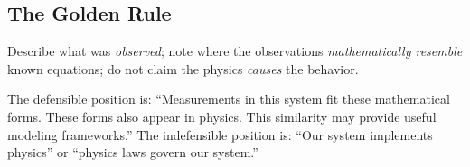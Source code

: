 \subsection{The Golden Rule}

Describe what was \emph{observed}; note where the observations
\emph{mathematically resemble} known equations; do not claim the physics
\emph{causes} the behavior.

The defensible position is: ``Measurements in this system fit these
mathematical forms. These forms also appear in physics. This similarity may
provide useful modeling frameworks.'' The indefensible position is: ``Our
system implements physics'' or ``physics laws govern our system.''
